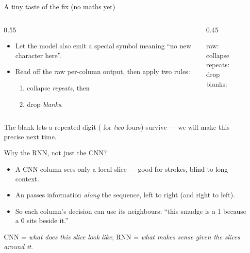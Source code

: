 \documentclass[10pt,aspectratio=169]{beamer}
\begin{document}
\begin{frame}{A tiny taste of the fix (no maths yet)}
  \begin{columns}[T]
    \begin{column}{0.55\textwidth}
      \begin{itemize}
        \item Let the model also emit a special  symbol \code{-} meaning ``no new character here''.
        \item Read off the raw per-column output, then apply two rules:
        \begin{enumerate}
          \item collapse \emph{repeats}, then
          \item drop \emph{blanks}.
        \end{enumerate}
      \end{itemize}
    \end{column}
    \begin{column}{0.45\textwidth}
      \begin{mathbox}
        raw:\ \ \\[2pt]
        collapse repeats:\ \\[2pt]
        drop blanks:\ \ 
      \end{mathbox}
    \end{column}
  \end{columns}
  \vspace{2pt}
  The blank lets a repeated digit ( for \emph{two} fours) survive --- we will make this precise next time.
\end{frame}

\begin{frame}{Why the RNN, not just the CNN?}
  \begin{itemize}
    \item A CNN column sees only a local slice --- good for strokes, blind to long context.
    \item An  passes information \emph{along} the sequence, left to right (and right to left).
    \item So each column's decision can use its neighbours: ``this smudge is a 1 because a 0 sits beside it.''
  \end{itemize}
  \begin{goodbox}
    CNN = \emph{what does this slice look like}; RNN = \emph{what makes sense given the slices around it}.
  \end{goodbox}
\end{frame}
\end{document}
